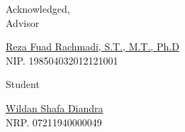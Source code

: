 \vspace{2ex}

\begin{center}

  \begin{multicols}{2}

    Acknowledged, \\
    Advisor
    \vspace{12ex}

    \underline{Reza Fuad Rachmadi, S.T., M.T., Ph.D} \\
    NIP. 198504032012121001

    \columnbreak

    \hfill \break
    Student
    \vspace{12ex}

    \underline{Wildan Shafa Diandra} \\
    NRP. 07211940000049

  \end{multicols}

\end{center}